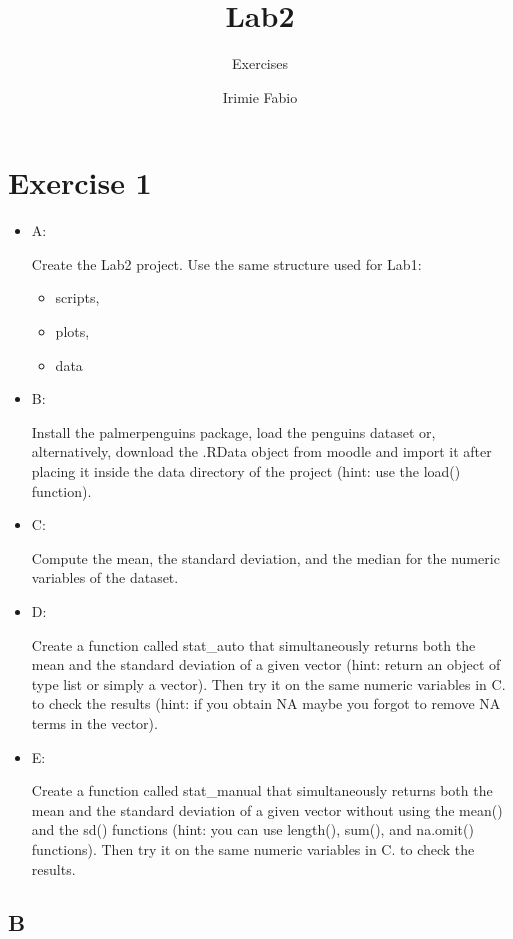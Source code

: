 \documentclass[
]{article}
\title{Lab2}
\subtitle{Exercises}
\author{Irimie Fabio}
\date{}
\providecommand{\tightlist}{%
  \setlength{\itemsep}{0pt}\setlength{\parskip}{0pt}}
\begin{document}
\maketitle

{
\setcounter{tocdepth}{2}
\tableofcontents
}
\hypertarget{exercise-1}{%
\section{Exercise 1}\label{exercise-1}}

\begin{itemize}
\item
  A:

  Create the Lab2 project. Use the same structure used for Lab1:

  \begin{itemize}
  \tightlist
  \item
    scripts,
  \item
    plots,
  \item
    data
  \end{itemize}
\item
  B:

  Install the palmerpenguins package, load the penguins dataset or,
  alternatively, download the .RData object from moodle and import it
  after placing it inside the data directory of the project (hint: use
  the load() function).
\item
  C:

  Compute the mean, the standard deviation, and the median for the
  numeric variables of the dataset.
\item
  D:

  Create a function called stat\_auto that simultaneously returns both
  the mean and the standard deviation of a given vector (hint: return an
  object of type list or simply a vector). Then try it on the same
  numeric variables in C. to check the results (hint: if you obtain NA
  maybe you forgot to remove NA terms in the vector).
\item
  E:

  Create a function called stat\_manual that simultaneously returns both
  the mean and the standard deviation of a given vector without using
  the mean() and the sd() functions (hint: you can use length(), sum(),
  and na.omit() functions). Then try it on the same numeric variables in
  C. to check the results.
\end{itemize}

\hypertarget{b}{%
\subsection{B}\label{b}}
\end{document}
